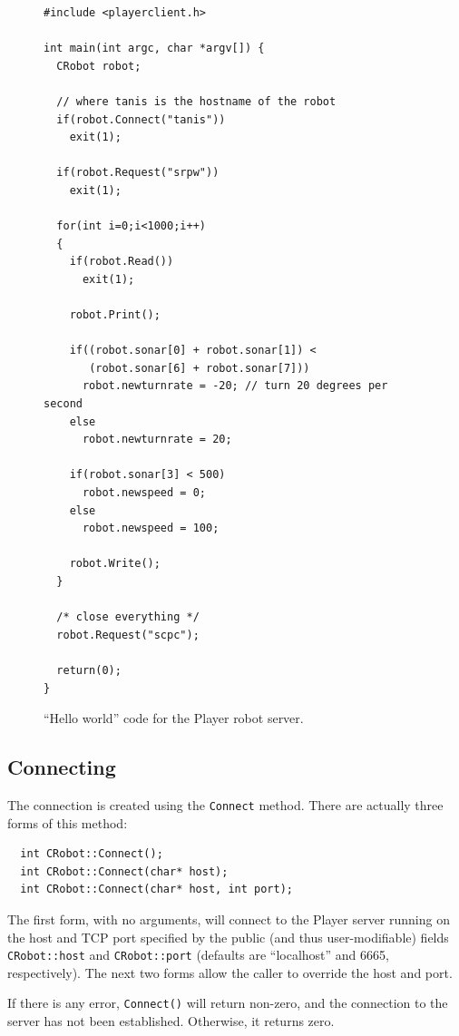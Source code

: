 \documentclass[11pt]{article}
\def\DEFAULTPORT {6665}
\begin{document}
\begin{figure}
\begin{verbatim}
#include <playerclient.h>

int main(int argc, char *argv[]) {
  CRobot robot;

  // where tanis is the hostname of the robot
  if(robot.Connect("tanis"))
    exit(1);

  if(robot.Request("srpw")) 
    exit(1); 

  for(int i=0;i<1000;i++) 
  {
    if(robot.Read())
      exit(1);

    robot.Print();

    if((robot.sonar[0] + robot.sonar[1]) < 
       (robot.sonar[6] + robot.sonar[7])) 
      robot.newturnrate = -20; // turn 20 degrees per second
    else
      robot.newturnrate = 20;
 
    if(robot.sonar[3] < 500) 
      robot.newspeed = 0;
    else 
      robot.newspeed = 100;
 
    robot.Write();
  }

  /* close everything */
  robot.Request("scpc");

  return(0);
}
\end{verbatim}

\caption{ ``Hello world'' code for the Player robot server.}
\label{helloworld}
\end{figure}

\subsection{Connecting}

The connection is created using
the {\tt Connect} method. There are actually three forms of this
method:

\begin{verbatim}
  int CRobot::Connect();
  int CRobot::Connect(char* host);
  int CRobot::Connect(char* host, int port);
\end{verbatim}

The first form, with no arguments, will connect to the Player server running
on the host and TCP port specified by the public (and thus user-modifiable) 
fields {\tt CRobot::host} and 
{\tt CRobot::port} (defaults are ``localhost'' and \DEFAULTPORT, respectively).  
The next two forms allow the caller to override the host and port.

If there is any error, {\tt Connect()} will return non-zero, and
the connection to the server has not been established.  Otherwise,
it returns zero.
\end{document}
